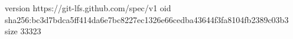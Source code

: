 version https://git-lfs.github.com/spec/v1
oid sha256:bc3d7bdca5ff414da6e7bc8227ec1326e66cedba43644f3fa8104fb2389c03b3
size 33323
